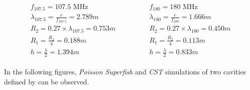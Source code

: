 \documentclass{article}
\begin{document}
\begin{eqnarray} \label{eq:107_180_MHZ_cavity_design_parameters}
    \begin{aligned}
        f_{107.5} = 107.5 \textrm{ MHz} \\
        \lambda_{107.5}  = \frac{c}{f_{107.5}} = 2.789 m \\
        R_2 = 0.27 \times \lambda_{107.5} = 0.753 m \\
        R_1 = \frac{R_2}{4} = 0.188 m \\
        h = \frac{\lambda}{2} = 1.394 m 
    \end{aligned}
    \qquad\qquad
    \begin{aligned}
        f_{180} = 180 \textrm{ MHz} \\
        \lambda_{180}  = \frac{c}{f_{180}} = 1.666 m \\
        R_2 = 0.27 \times\lambda_{180} = 0.450 m \\
        R_1 = \frac{R_2}{4} = 0.113 m \\
        h = \frac{\lambda}{2} = 0.833 m 
    \end{aligned}
\end{eqnarray}

In the following figures, \textit{Poisson Superfish} and \textit{CST} simulations of two cavities defined by  can be observed.
\end{document}
